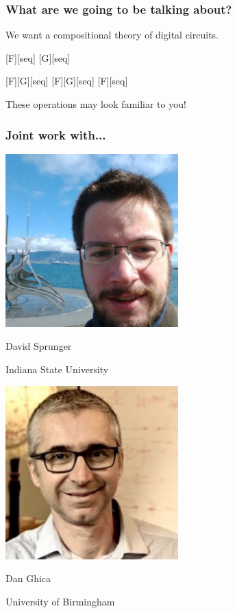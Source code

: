 \begin{frame}
    \frametitle{What are we going to be talking about?}

    \centering
    \LARGE
    We want a \alert{compositional} theory of digital circuits.

    \vspace{0.5em}

    [F][seq]
    [G][seq]

    \vspace{0.5em}

    [F][G][seq]
    \wait
    \quad
    [F][G][seq]
    \wait
    \quad
    [F][seq]

    \wait
    \vspace{0.5em}

    These operations may look familiar to you!

\end{frame}

\begin{frame}
    \frametitle{Joint work with...}

    \begin{minipage}{0.49\textwidth}
        \centering
        \includegraphics[width=0.5\textwidth]{imgs/sprunger}

        David Sprunger

        \scriptsize
        Indiana State University
    \end{minipage}
    \wait
    \begin{minipage}{0.49\textwidth}
        \centering
        \includegraphics[width=0.5\textwidth]{imgs/ghica}

        Dan Ghica

        \scriptsize
        University of Birmingham
    \end{minipage}
\end{frame}
